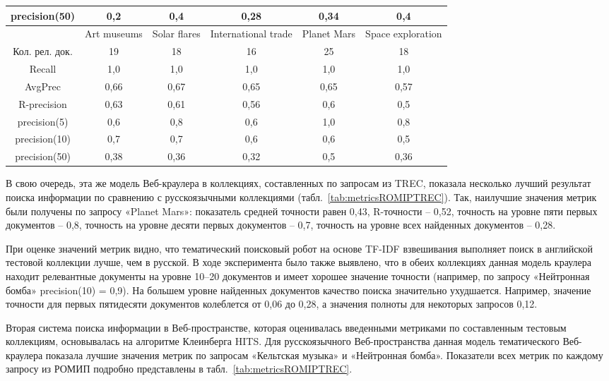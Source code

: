 \begin{table}[ht]
\begin{adjustbox}{width=0.9\textwidth}
\begin{tabular}{| c | c | c | c | c | c |}
			\hline
			precision(50) & 0,2 & 0,4 & 0,28 & 0,34 & 0,4  \\
			\hline
			& Art museums & Solar flares & International trade &  Planet Mars &  Space exploration \\
			\hline
			Кол. рел. док. & 19 & 18 & 16 & 25 & 18  \\
			\hline
			Recall & 1,0 & 1,0 & 1,0 & 1,0 & 1,0 \\
			\hline
			AvgPrec & 0,66 & 0,67 & 0,65 & 0,65 & 0,57  \\
			\hline
			R-precision & 0,63 & 0,61 & 0,56 & 0,6 & 0,5  \\
			\hline
			precision(5) & 0,6 & 0,8 & 0,6 & 1,0 & 0,8  \\
			\hline
			precision(10) & 0,7 & 0,7 & 0,6 & 0,6 & 0,5  \\
			\hline
			precision(50) & 0,38 & 0,36 & 0,32 & 0,5 & 0,36  \\
			\hline
		\end{tabular}%
	\end{adjustbox}
\end{table}

В свою очередь, эта же модель Веб-краулера в коллекциях, составленных по запросам из TREC, показала несколько лучший результат поиска информации по сравнению с русскоязычными коллекциями (табл.~\cref{tab:metricsROMIPTREC}). Так, наилучшие значения метрик были получены по запросу «Planet Mars»: показатель средней точности равен 0,43, R-точности -- 0,52, точность на уровне пяти первых документов -- 0,8, точность на уровне десяти первых документов -- 0,7, точность на уровне всех найденных документов -- 0,28.

При оценке значений метрик видно, что тематический поисковый робот на основе TF-IDF взвешивания выполняет поиск в английской тестовой коллекции лучше, чем в русской. В ходе эксперимента было также выявлено, что в обеих коллекциях данная модель краулера находит релевантные документы на уровне 10–20 документов и имеет хорошее значение точности (например, по запросу «Нейтронная бомба» precision(10) = 0,9). На большем уровне найденных документов качество поиска значительно ухудшается. Например, значение точности для первых пятидесяти документов колеблется от 0,06 до 0,28, а значения полноты для некоторых запросов 0,12.

Вторая система поиска информации в Веб-пространстве, которая оценивалась введенными метриками по составленным тестовым коллекциям, основывалась на алгоритме Клеинберга HITS. Для русскоязычного Веб-пространства данная модель тематического Веб-краулера показала лучшие значения метрик по запросам «Кельтская музыка» и «Нейтронная бомба». Показатели всех метрик по каждому запросу из РОМИП подробно представлены в табл.~\cref{tab:metricsROMIPTREC}.

